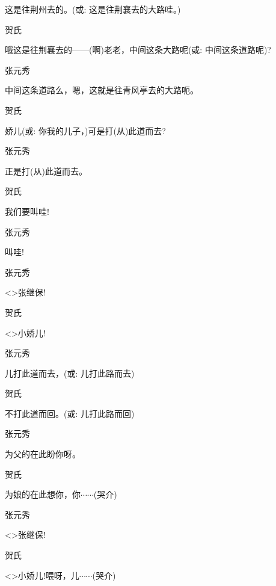 这是往荆州去的。({\akai 或}: 这是往荆襄去的大路哇。)

贺氏\hspace{30pt}~

哦这是往荆襄去的------(啊)老老，中间这条大路呢({\akai 或}: 中间这条道路呢)?

张元秀\hspace{20pt}~

中间这条道路么，嗯，这就是往青风亭去的大路呃。

贺氏\hspace{30pt}~

娇儿({\akai 或}: 你我的儿子，)可是打(从)此道而去?

张元秀\hspace{20pt}~

正是打(从)此道而去。

贺氏\hspace{30pt}~

我们要叫哇!

张元秀\hspace{20pt}~

叫哇!

张元秀\hspace{20pt}~

\textless{}\!\textgreater{}张继保!

贺氏\hspace{30pt}~

\textless{}\!\textgreater{}小娇儿!

张元秀\hspace{20pt}~

儿打此道而去，({\akai 或}: 儿打此路而去)

贺氏\hspace{30pt}~

不打此道而回。({\akai 或}: 儿打此路而回)

张元秀\hspace{20pt}~

为父的在此盼你呀。

贺氏\hspace{30pt}~

为娘的在此想你，你$\cdots{}\cdots{}$(哭介)

张元秀\hspace{20pt}~

\textless{}\!\textgreater{}张继保!

贺氏

\textless{}\!\textgreater{}小娇儿!喂呀，儿$\cdots{}\cdots{}$(哭介)


